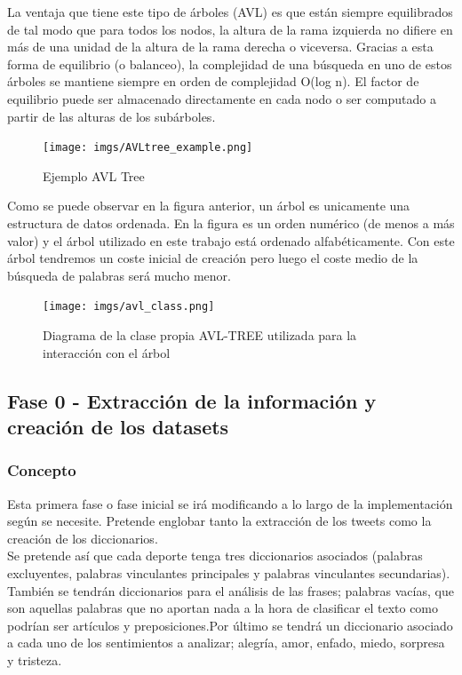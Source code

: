 \documentclass[../all.tex]{subfiles}
\begin{document}
    	La ventaja que tiene este tipo de árboles (AVL) es que están siempre equilibrados de tal modo que para todos los nodos, la altura de la rama izquierda no difiere en más de una unidad de la altura de la rama derecha o viceversa. Gracias a esta forma de equilibrio (o balanceo), la complejidad de una búsqueda en uno de estos árboles se mantiene siempre en orden de complejidad O(log n). El factor de equilibrio puede ser almacenado directamente en cada nodo o ser computado a partir de las alturas de los subárboles.\\
    	
    	\begin{figure}[H]
    		\centering
    		\texttt{[image: imgs/AVLtree\_example.png]}
    		\caption{Ejemplo AVL Tree}
    	\end{figure}
    	
    	Como se puede observar en la figura anterior, un árbol es unicamente una estructura de datos ordenada. En la figura es un orden numérico (de menos a más valor)  y el árbol utilizado en este trabajo está ordenado alfabéticamente. Con este árbol tendremos un coste inicial de creación pero luego el coste medio de la búsqueda de palabras será mucho menor.
    	\begin{figure}[H]
    		\centering
    		\texttt{[image: imgs/avl\_class.png]}
    		\caption{Diagrama de la clase propia AVL-TREE utilizada para la interacción con el árbol}
    	\end{figure}
    
\newpage
\subsection{Fase 0 - Extracción de la información y creación de los datasets}
    \subsubsection{Concepto}
        Esta primera fase o fase inicial se irá modificando a lo largo de la implementación según se necesite. Pretende englobar tanto la extracción de los tweets como la creación de los diccionarios.\\
        
        Se pretende así que cada deporte tenga tres diccionarios asociados (palabras excluyentes, palabras vinculantes principales y palabras vinculantes secundarias). También se tendrán diccionarios para el análisis de las frases; palabras vacías, que son aquellas palabras que no aportan nada a la hora de clasificar el texto como podrían ser artículos y preposiciones.Por último se tendrá un diccionario asociado a cada uno de los sentimientos a analizar; alegría, amor, enfado, miedo, sorpresa y tristeza.
    \newpage 
\end{document}
